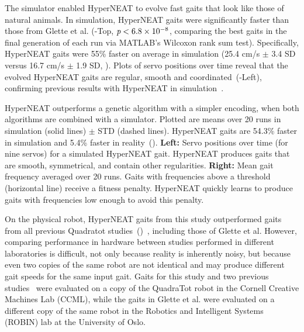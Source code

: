 

The simulator enabled HyperNEAT to evolve
fast gaits that look like those of natural animals. In simulation, HyperNEAT gaits were significantly faster than those from Glette et al. (-Top, $\emph{p} < 6.8\times10^{-8}$, comparing the best gaits in the final generation of each run via MATLAB's Wilcoxon rank sum test).  
Specifically, HyperNEAT gaits were 55\% faster on average in simulation (25.4
cm/s $\pm$ 3.4 SD versus 16.7 cm/s $\pm$ 1.9 SD, ).
Plots of servo positions over time reveal that the evolved HyperNEAT gaits are regular, smooth and coordinated~(-Left), confirming previous results with HyperNEAT in simulation~\cite{clune2009evolving,clune2011performance}.

{HyperNEAT outperforms a genetic algorithm with a simpler encoding, when both algorithms are combined with a simulator. Plotted are means over 20 runs in simulation (solid lines) $\pm$ STD (dashed lines). HyperNEAT gaits are 54.3\% faster in
simulation and 5.4\% faster in reality~().
\textbf{Left: }
Servo positions over time (for nine servos) for a simulated HyperNEAT gait. HyperNEAT produces gaits that are smooth, symmetrical, and contain other regularities. 
\textbf{Right: }Mean gait frequency averaged over 20 runs. 
Gaits with frequencies above a threshold (horizontal line) receive a fitness penalty. HyperNEAT quickly learns to produce gaits with frequencies low enough to avoid this penalty.
}


On the physical robot, HyperNEAT gaits from this study outperformed gaits from all previous Quadratot studies~()~\cite{yos:clune,haocheng,glette}, including those of Glette et al. 
 However, comparing performance in hardware between studies performed in
different laboratories is difficult, not only because reality is
inherently noisy, but because even two copies of the same robot are
not identical and may produce different gait speeds for the same input
gait. Gaits for this study and two previous studies~\cite{yos:clune,haocheng} were evaluated on a copy of the QuadraTot robot in the Cornell Creative Machines Lab (CCML), while the gaits in Glette et al. were evaluated on a different copy of the same robot in the Robotics and
Intelligent Systems (ROBIN) lab at the University of Oslo.

